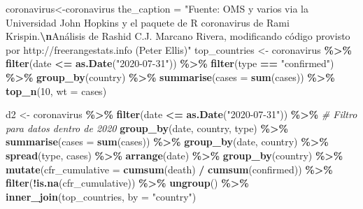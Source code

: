 \documentclass[
]{article}
\newenvironment{Shaded}{\begin{snugshade}}{\end{snugshade}}
\newcommand{\AttributeTok}[1]{\textcolor[rgb]{0.13,0.29,0.53}{#1}}
\newcommand{\CommentTok}[1]{\textcolor[rgb]{0.56,0.35,0.01}{\textit{#1}}}
\newcommand{\DecValTok}[1]{\textcolor[rgb]{0.00,0.00,0.81}{#1}}
\newcommand{\FunctionTok}[1]{\textcolor[rgb]{0.13,0.29,0.53}{\textbf{#1}}}
\newcommand{\NormalTok}[1]{#1}
\newcommand{\OtherTok}[1]{\textcolor[rgb]{0.56,0.35,0.01}{#1}}
\newcommand{\SpecialCharTok}[1]{\textcolor[rgb]{0.81,0.36,0.00}{\textbf{#1}}}
\newcommand{\StringTok}[1]{\textcolor[rgb]{0.31,0.60,0.02}{#1}}
\begin{document}
\begin{Shaded}
\begin{Highlighting}[]
\NormalTok{coronavirus}\OtherTok{\textless{}{-}}\NormalTok{coronavirus}
\NormalTok{the\_caption }\OtherTok{=} \StringTok{"Fuente: OMS y varios via la Universidad John Hopkins y el paquete de R \textquotesingle{}coronavirus\textquotesingle{} de Rami Krispin.}\SpecialCharTok{\textbackslash{}n}\StringTok{Análisis de Rashid C.J. Marcano Rivera, modificando código provisto por http://freerangestats.info (Peter Ellis)"}
\NormalTok{top\_countries }\OtherTok{\textless{}{-}}\NormalTok{ coronavirus }\SpecialCharTok{\%\textgreater{}\%}
  \FunctionTok{filter}\NormalTok{(date }\SpecialCharTok{\textless{}=} \FunctionTok{as.Date}\NormalTok{(}\StringTok{"2020{-}07{-}31"}\NormalTok{)) }\SpecialCharTok{\%\textgreater{}\%}
  \FunctionTok{filter}\NormalTok{(type }\SpecialCharTok{==} \StringTok{"confirmed"}\NormalTok{) }\SpecialCharTok{\%\textgreater{}\%}
  \FunctionTok{group\_by}\NormalTok{(country) }\SpecialCharTok{\%\textgreater{}\%}
  \FunctionTok{summarise}\NormalTok{(}\AttributeTok{cases =} \FunctionTok{sum}\NormalTok{(cases)) }\SpecialCharTok{\%\textgreater{}\%}
  \FunctionTok{top\_n}\NormalTok{(}\DecValTok{10}\NormalTok{, }\AttributeTok{wt =}\NormalTok{ cases)}

\NormalTok{d2 }\OtherTok{\textless{}{-}}\NormalTok{ coronavirus }\SpecialCharTok{\%\textgreater{}\%}
  \FunctionTok{filter}\NormalTok{(date }\SpecialCharTok{\textless{}=} \FunctionTok{as.Date}\NormalTok{(}\StringTok{"2020{-}07{-}31"}\NormalTok{)) }\SpecialCharTok{\%\textgreater{}\%}  \CommentTok{\# Filtro para datos dentro de 2020}
  \FunctionTok{group\_by}\NormalTok{(date, country, type) }\SpecialCharTok{\%\textgreater{}\%}
  \FunctionTok{summarise}\NormalTok{(}\AttributeTok{cases =} \FunctionTok{sum}\NormalTok{(cases)) }\SpecialCharTok{\%\textgreater{}\%}
  \FunctionTok{group\_by}\NormalTok{(date, country) }\SpecialCharTok{\%\textgreater{}\%}
  \FunctionTok{spread}\NormalTok{(type, cases) }\SpecialCharTok{\%\textgreater{}\%}
  \FunctionTok{arrange}\NormalTok{(date) }\SpecialCharTok{\%\textgreater{}\%}
  \FunctionTok{group\_by}\NormalTok{(country) }\SpecialCharTok{\%\textgreater{}\%}
  \FunctionTok{mutate}\NormalTok{(}\AttributeTok{cfr\_cumulative =} \FunctionTok{cumsum}\NormalTok{(death) }\SpecialCharTok{/} \FunctionTok{cumsum}\NormalTok{(confirmed)) }\SpecialCharTok{\%\textgreater{}\%}
  \FunctionTok{filter}\NormalTok{(}\SpecialCharTok{!}\FunctionTok{is.na}\NormalTok{(cfr\_cumulative)) }\SpecialCharTok{\%\textgreater{}\%}
  \FunctionTok{ungroup}\NormalTok{() }\SpecialCharTok{\%\textgreater{}\%}
  \FunctionTok{inner\_join}\NormalTok{(top\_countries, }\AttributeTok{by =} \StringTok{"country"}\NormalTok{) }
\end{Highlighting}
\end{Shaded}
\end{document}
